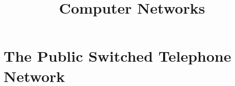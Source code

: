 \documentclass{article}
\title{Computer Networks}
\author{}
\date{}
\begin{document}
\maketitle

%

%

\section{The Public Switched Telephone Network}


%
\end{document}
